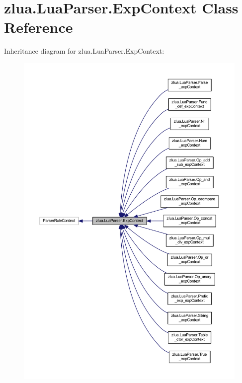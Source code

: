 \hypertarget{classzlua_1_1_lua_parser_1_1_exp_context}{}\section{zlua.\+Lua\+Parser.\+Exp\+Context Class Reference}
\label{classzlua_1_1_lua_parser_1_1_exp_context}


Inheritance diagram for zlua.\+Lua\+Parser.\+Exp\+Context\+:
\nopagebreak
\begin{figure}[H]
\begin{center}
\leavevmode
\includegraphics[width=350pt]{classzlua_1_1_lua_parser_1_1_exp_context__inherit__graph}
\end{center}
\end{figure}


